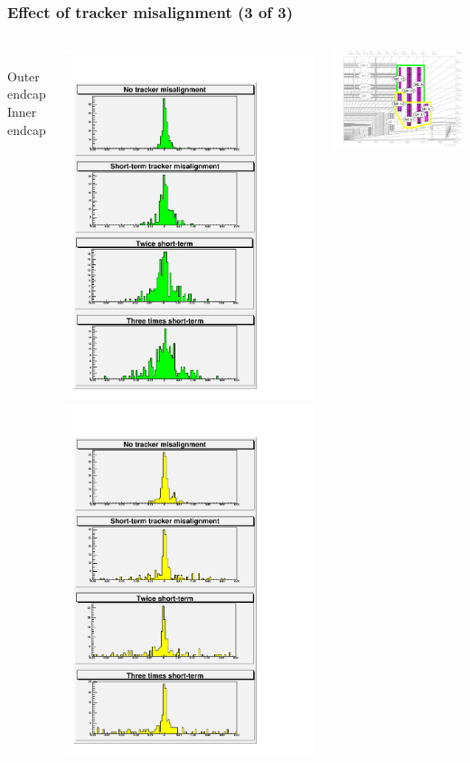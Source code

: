 \documentclass[compress]{beamer}
\begin{document}
\begin{frame}
\frametitle{Effect of tracker misalignment (3 of 3)}
\begin{columns}
\mbox{ } \hfill Outer endcap \hfill \hfill Inner endcap \hfill \mbox{ }

\includegraphics[width=0.5\linewidth]{trackerdep_outer_endcap.pdf}
\includegraphics[width=0.5\linewidth]{trackerdep_inner_endcap.pdf}

\mbox{\hspace{-0.5 cm}} \includegraphics[width=\linewidth]{outer_inner_endcap.pdf}


\end{columns}
\end{frame}
\end{document}
